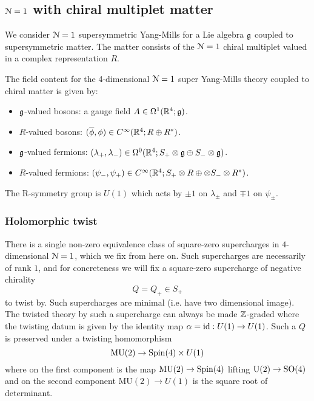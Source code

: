 \documentclass[10pt, oneside]{article}
\newcommand{\MU}{\mathrm{MU}}
\renewcommand{\U}{\mathrm{U}}
\begin{document}
\subsection{\texorpdfstring{$\mathcal N=1$}{N=1} with chiral multiplet matter} \label{4d_1_section}
We consider $\mathcal N=1$ supersymmetric Yang-Mills for a Lie algebra $\mathfrak g$ coupled to supersymmetric matter.
The matter consists of the $\mathcal N=1$ chiral multiplet valued in a complex representation $R$. 


The field content for the 4-dimensional $\mathcal N=1$ super Yang-Mills theory coupled to chiral matter is given by:
\begin{itemize}
\item $\mathfrak g$-valued bosons: a gauge field $A \in \Omega^1(\mathbb R^4 ; \mathfrak g)$.
\item $R$-valued bosons: $(\overline{\phi}, \phi) \in C^\infty(\mathbb R^4 ; R \oplus R^*)$.
\item $\mathfrak g$-valued fermions: $(\lambda_+, \lambda_-) \in \Omega^0(\mathbb R^4 ; S_+ \otimes \mathfrak g \oplus S_- \otimes \mathfrak g)$.
\item $R$-valued fermions: $(\psi_-,\psi_+) \in C^\infty(\mathbb R^4 ; S_+ \otimes R \oplus \otimes S_- \otimes R^*)$.
\end{itemize}

The R-symmetry group is $U(1)$ which acts by $\pm 1$ on $\lambda_{\pm}$ and $\mp 1$ on $\psi_{\pm}$. 

\subsubsection{Holomorphic twist}

There is a single non-zero equivalence class of square-zero supercharges in $4$-dimensional $\mathcal{N} = 1$, which we fix from here on.
Such supercharges are necessarily of rank $1$, and for concreteness we will fix a square-zero supercharge of negative chirality $$Q = Q_+ \in S_+$$ to twist by. 
Such supercharges are minimal (i.e. have two dimensional image).  
The twisted theory by such a supercharge can always be made $\mathbb Z$-graded where the twisting datum is given by the identity map $\alpha = {\rm id} : U(1) \to U(1)$. 
Such a $Q$ is preserved under a twisting homomorphism
\[
\MU(2) \to {\rm Spin}(4) \times U(1) 
\]
where on the first component is the map $\MU(2) \to {\rm Spin}(4)$ lifting $\U(2) \to \SO(4)$ and on the second component $\MU(2) \to U(1)$ is the square root of determinant. 
\end{document}

